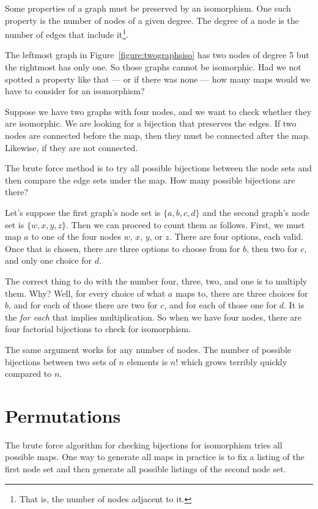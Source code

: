 \documentclass{iansnotes}
\begin{document}
  Some properties of a graph must be preserved by an isomorphism.
  One such property is the number of nodes of a given degree.
  The degree of a node is the number of edges that include it\footnote{That is, the number of nodes adjacent to it.}.

  The leftmost graph in Figure~\ref{figure:twographsiso} has two nodes of degree 5 but the rightmost has only one.
  So those graphs cannot be isomorphic.
  Had we not spotted a property like that --- or if there was none --- how many maps would we have to consider for an isomorphism?

  Suppose we have two graphs with four nodes, and we want to check whether they are isomorphic.
  We are looking for a bijection that preserves the edges.
  If two nodes are connected before the map, then they must be connected after the map.
  Likewise, if they are not connected.

  The brute force method is to try all possible bijections between the node sets and then compare the edge sets under the map.
  How many possible bijections are there?
  
  Let's suppose the first graph's node set is $\{a, b, c, d\}$ and the second graph's node set is $\{w, x, y, z\}$.
  Then we can proceed to count them as follows.
  First, we must map $a$ to one of the four nodes $w$, $x$, $y$, or $z$.
  There are four options, each valid.
  Once that is chosen, there are three options to choose from for $b$, then two for $c$, and only one choice for $d$.

  The correct thing to do with the number four, three, two, and one is to multiply them.
  Why?
  Well, for every choice of what $a$ maps to, there are three choices for $b$, and for each of those there are two for $c$, and for each of those one for $d$.
  It is the \emph{for each} that implies multiplication.
  So when we have four nodes, there are four factorial bijections to check for isomorphism.

  The same argument works for any number of nodes.
  The number of possible bijections between two sets of $n$ elements is $n!$ which grows terribly quickly compared to $n$.

\section{Permutations}
  The brute force algorithm for checking bijections for isomorphism tries all possible maps.
  One way to generate all maps in practice is to fix a listing of the first node set and then generate all possible listings of the second node set.
  
\end{document}
